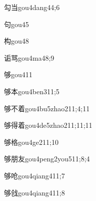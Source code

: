 \begin{verbete}{勾当}{gou4dang4}{4;6}
\end{verbete}

\begin{verbete}{句}{gou4}{5}
\end{verbete}

\begin{verbete}{构}{gou4}{8}
\end{verbete}

\begin{verbete}{诟骂}{gou4ma4}{8;9}
\end{verbete}

\begin{verbete}{够}{gou4}{11}
\end{verbete}

\begin{verbete}{够本}{gou4ben3}{11;5}
\end{verbete}

\begin{verbete}{够不着}{gou4bu5zhao2}{11;4;11}
\end{verbete}

\begin{verbete}{够得着}{gou4de5zhao2}{11;11;11}
\end{verbete}

\begin{verbete}{够格}{gou4ge2}{11;10}
\end{verbete}

\begin{verbete}{够朋友}{gou4peng2you5}{11;8;4}
\end{verbete}

\begin{verbete}{够呛}{gou4qiang4}{11;7}
\end{verbete}

\begin{verbete}{够戗}{gou4qiang4}{11;8}
\end{verbete}

